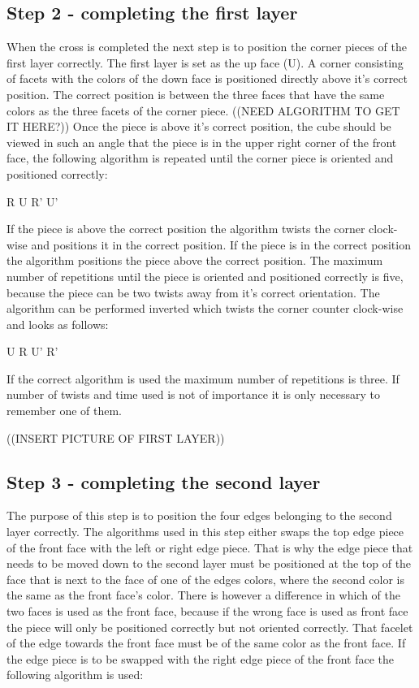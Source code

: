 \subsection{Step 2 - completing the first layer}
When the cross is completed the next step is to position the corner pieces of the first layer correctly. The first layer is set as the up face (U). A corner consisting of facets with the colors of the down face is positioned directly above it's correct  position. The correct position is between the three faces that have the same colors as the three facets of the corner piece. ((NEED ALGORITHM TO GET IT HERE?)) Once the piece is above it's correct position, the cube should be viewed in such an angle that the piece is in the upper right corner of the front face, the following algorithm is repeated until the corner piece is oriented and positioned correctly:

R U R' U'

If the piece is above the correct position the algorithm twists the corner clock-wise and positions it in the correct position. If the piece is in the correct position the algorithm positions the piece above the correct position. The maximum number of repetitions until the piece is oriented and positioned correctly is five, because the piece can be two twists away from it's correct orientation. 
The algorithm can be performed inverted which twists the corner counter clock-wise and looks as follows:

U R U' R'

If the correct algorithm is used the maximum number of repetitions is three. If number of twists and time used is not of importance it is only necessary to remember one of them.

((INSERT PICTURE OF FIRST LAYER))

\subsection{Step 3 - completing the second layer}
The purpose of this step is to position the four edges belonging to the second layer correctly. The algorithms used in this step either swaps the top edge piece of the front face with the left or right edge piece. That is why the edge piece that needs to be moved down to the second layer must be positioned at the top of the face that is next to the face of one of the edges colors, where the second color is the same as the front face's color. There is however a difference in which of the two faces is used as the front face, because if the wrong face is used as front face the piece will only be positioned correctly but not oriented correctly. That facelet of the edge towards the front face must be of the same color as the front face. If the edge piece is to be swapped with the right edge piece of the front face the following algorithm is used:

